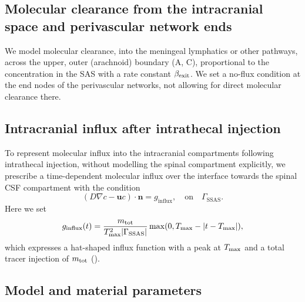\documentclass[fleqn,10pt]{wlscirep}
\begin{document}
\subsection*{Molecular clearance from the intracranial space and perivascular network ends}

We model molecular clearance, into the meningeal lymphatics or other
pathways, across the upper, outer (arachnoid) boundary
(A, C), proportional to the
concentration in the SAS with a rate constant $\beta_{\rm exit}$. We
set a no-flux condition at the end nodes of the perivascular networks,
not allowing for direct molecular clearance there.

\subsection*{Intracranial influx after intrathecal injection}
To represent molecular influx into the intracranial compartments
following intrathecal injection, without modelling the spinal
compartment explicitly, we prescribe a time-dependent molecular influx
over the interface towards the spinal CSF compartment with the condition
\begin{equation*}
  (D \nabla c - \bm u c ) \cdot \bm{n} = g_{\mathrm{influx}},  \quad \mathrm{on}  \quad \Gamma_{\mathrm{SSAS}}.
\end{equation*}
Here we set
\begin{equation*}
  g_\mathrm{influx}(t) = \frac{m_{\rm tot}}{T_{\rm max}^2 |\Gamma_{\rm SSAS}|} \max(0, T_{\rm max} - |t - T_{\rm max}|), 
\end{equation*}
which expresses a hat-shaped influx function with a peak at $T_{\rm max}$ and a total tracer injection of $m_{\rm tot}$ ().

\subsection*{Model and material parameters}
\end{document}
